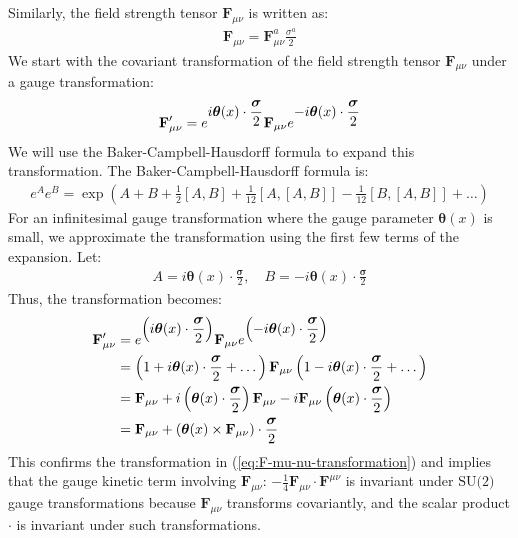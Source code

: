 \begin{enumerate}
    Similarly, the field strength tensor $\mathbf{F}_{\mu\nu}$ is written as:
    \begin{align}
        \mathbf{F}_{\mu\nu} = \mathbf{F}_{\mu\nu}^a \frac{\sigma^a}{2}
    \end{align}
    We start with the covariant transformation of the field strength tensor $\mathbf{F}_{\mu\nu}$ under a gauge transformation:
    \begin{align}
        \mathbf{F}_{\mu\nu}^\prime = e^{\displaystyle \displaystyle i \boldsymbol{\theta}(x) \cdot \frac{\boldsymbol{\sigma}}{2}} \mathbf{F}_{\mu\nu} e^{\displaystyle -i \boldsymbol{\theta}(x) \cdot \frac{\boldsymbol{\sigma}}{2}}
    \end{align}    
    We will use the Baker-Campbell-Hausdorff formula to expand this transformation. The Baker-Campbell-Hausdorff formula is:
    \begin{align*}
        e^A e^B = \exp\left( A + B + \frac{1}{2} [A, B] + \frac{1}{12} [A, [A, B]] - \frac{1}{12} [B, [A, B]] + \dots \right)
    \end{align*}
    For an infinitesimal gauge transformation where the gauge parameter $\boldsymbol{\theta}(x)$ is small, we approximate the transformation using the first few terms of the expansion. Let:
    \begin{align*}
        A = i \boldsymbol{\theta}(x) \cdot \frac{\boldsymbol{\sigma}}{2}, \quad B = -i \boldsymbol{\theta}(x) \cdot \frac{\boldsymbol{\sigma}}{2}
    \end{align*}
    Thus, the transformation becomes:
    \begin{align*}
        \mathbf{F}_{\mu\nu}^\prime &= e^{\displaystyle\left( i \boldsymbol{\theta}(x) \cdot \frac{\boldsymbol{\sigma}}{2} \right)} \mathbf{F}_{\mu\nu} e^{\displaystyle\left( -i \boldsymbol{\theta}(x) \cdot \frac{\boldsymbol{\sigma}}{2} \right)} \notag \\
        &= \left( 1 + i \boldsymbol{\theta}(x) \cdot \frac{\boldsymbol{\sigma}}{2} + \dots \right) \mathbf{F}_{\mu\nu} \left( 1 - i \boldsymbol{\theta}(x) \cdot \frac{\boldsymbol{\sigma}}{2} + \dots \right)\notag\\
        &= \mathbf{F}_{\mu\nu} + i \left( \boldsymbol{\theta}(x) \cdot \frac{\boldsymbol{\sigma}}{2} \right) \mathbf{F}_{\mu\nu} - i \mathbf{F}_{\mu\nu} \left( \boldsymbol{\theta}(x) \cdot \frac{\boldsymbol{\sigma}}{2} \right) \notag \\
    &= \mathbf{F}_{\mu\nu} + \left( \boldsymbol{\theta}(x) \times \mathbf{F}_{\mu\nu} \right) \cdot \frac{\boldsymbol{\sigma}}{2}
\end{align*}
This confirms the transformation in (\ref{eq:F-mu-nu-transformation}) and implies that the gauge kinetic term involving $\mathbf{F}_{\mu\nu}$: $\displaystyle-\frac{1}{4} \mathbf{F}_{\mu\nu} \cdot \mathbf{F}^{\mu\nu}$ is invariant under $\text{SU(2)}$ gauge transformations because $\mathbf{F}_{\mu\nu}$ transforms covariantly, and the scalar product $\cdot$ is invariant under such transformations.


\end{enumerate}
